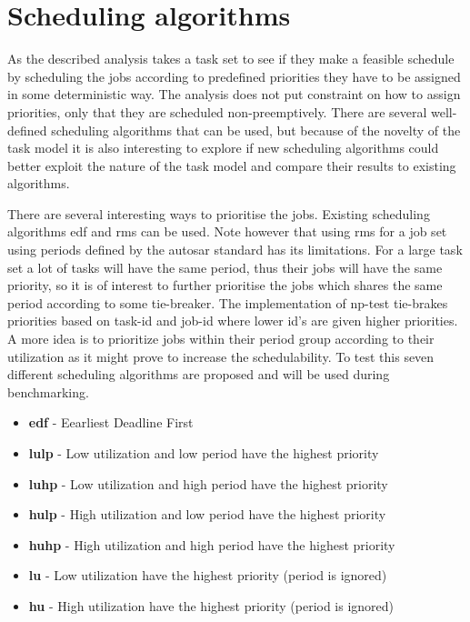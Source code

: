 \documentclass{kththesis}
\begin{document}
\section{Scheduling algorithms} \label{sec:scheduling_algorithms}

As the described analysis takes a task set to see if they make a feasible schedule by
scheduling the jobs according to predefined priorities they have to be assigned in some
deterministic way. The analysis does not put constraint on how to assign priorities, only that they
are scheduled non-preemptively. There are several well-defined scheduling algorithms that can be
used, but because of the novelty of the task model it is also interesting to explore
if new scheduling algorithms could better exploit the nature of the task model and compare their
results to existing algorithms.

There are several interesting ways to prioritise the jobs. Existing scheduling algorithms
\acrshort{edf} and \acrshort{rms} can be used. Note however that using \acrshort{rms} for a job
set using periods defined by the \acrshort{autosar} standard has its limitations. For a large task
set a lot of tasks will have the same period, thus their jobs will have the same priority, so it is
of interest to further prioritise the jobs which shares the same period according to some
tie-breaker. The implementation of \acrshort{np}-test tie-brakes priorities based on task-id and
job-id where lower id's are given higher priorities. A more  idea is to prioritize jobs within their
period group according to their utilization as it might prove to increase the schedulability. To
test this seven different scheduling algorithms are proposed and will be used during benchmarking.

\begin{itemize}
    \item \textbf{\acrshort{edf}} - Eearliest Deadline First
    \item \textbf{\acrshort{lulp}} - Low utilization and low period have the highest priority
    \item \textbf{\acrshort{luhp}} - Low utilization and high period have the highest priority
    \item \textbf{\acrshort{hulp}} - High utilization and low period have the highest priority
    \item \textbf{\acrshort{huhp}} - High utilization and high period have the highest priority
    \item \textbf{\acrshort{lu}} - Low utilization have the highest priority (period is ignored)
    \item \textbf{\acrshort{hu}} - High utilization have the highest priority (period is ignored)
\end{itemize}
\end{document}
